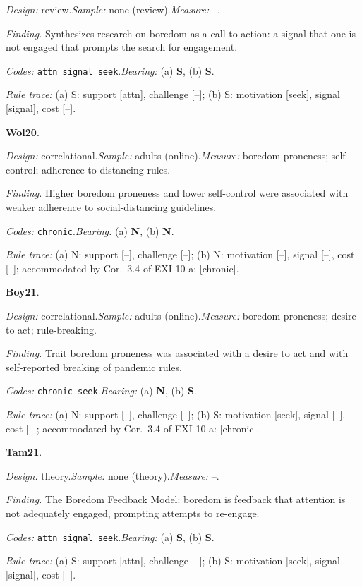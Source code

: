 {\small\noindent\textit{Design:} review.\quad \textit{Sample:} none (review).\quad \textit{Measure:} --.\par
\noindent\textit{Finding.} Synthesizes research on boredom as a call to action: a signal that one is not engaged that prompts the search for engagement.\par
\noindent\textit{Codes:} \texttt{attn signal seek}.\quad \textit{Bearing:} (a) \textbf{S}, (b) \textbf{S}.\par
\noindent\textit{Rule trace:} (a) S: support {[}attn{]}, challenge {[}--{]}; (b) S: motivation {[}seek{]}, signal {[}signal{]}, cost {[}--{]}.\par}
\medskip
{}
\noindent\textbf{Wol20}\enspace \citet{Wolff2020}.\par
{\small\noindent\textit{Design:} correlational.\quad \textit{Sample:} adults (online).\quad \textit{Measure:} boredom proneness; self-control; adherence to distancing rules.\par
\noindent\textit{Finding.} Higher boredom proneness and lower self-control were associated with weaker adherence to social-distancing guidelines.\par
\noindent\textit{Codes:} \texttt{chronic}.\quad \textit{Bearing:} (a) \textbf{N}, (b) \textbf{N}.\par
\noindent\textit{Rule trace:} (a) N: support {[}--{]}, challenge {[}--{]}; (b) N: motivation {[}--{]}, signal {[}--{]}, cost {[}--{]}; accommodated by Cor.~3.4 of EXI-10-a: {[}chronic{]}.\par}
\medskip
{}
\noindent\textbf{Boy21}\enspace \citet{Boylan2021}.\par
{\small\noindent\textit{Design:} correlational.\quad \textit{Sample:} adults (online).\quad \textit{Measure:} boredom proneness; desire to act; rule-breaking.\par
\noindent\textit{Finding.} Trait boredom proneness was associated with a desire to act and with self-reported breaking of pandemic rules.\par
\noindent\textit{Codes:} \texttt{chronic seek}.\quad \textit{Bearing:} (a) \textbf{N}, (b) \textbf{S}.\par
\noindent\textit{Rule trace:} (a) N: support {[}--{]}, challenge {[}--{]}; (b) S: motivation {[}seek{]}, signal {[}--{]}, cost {[}--{]}; accommodated by Cor.~3.4 of EXI-10-a: {[}chronic{]}.\par}
\medskip
{}
\noindent\textbf{Tam21}\enspace \citet{Tam2021}.\par
{\small\noindent\textit{Design:} theory.\quad \textit{Sample:} none (theory).\quad \textit{Measure:} --.\par
\noindent\textit{Finding.} The Boredom Feedback Model: boredom is feedback that attention is not adequately engaged, prompting attempts to re-engage.\par
\noindent\textit{Codes:} \texttt{attn signal seek}.\quad \textit{Bearing:} (a) \textbf{S}, (b) \textbf{S}.\par
\noindent\textit{Rule trace:} (a) S: support {[}attn{]}, challenge {[}--{]}; (b) S: motivation {[}seek{]}, signal {[}signal{]}, cost {[}--{]}.\par}
\medskip
